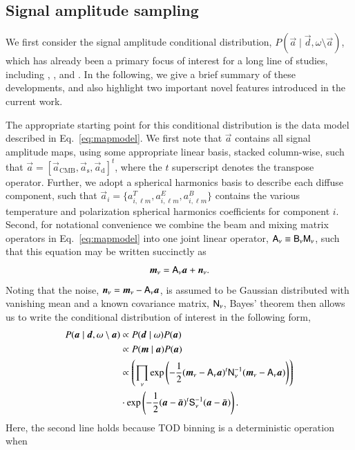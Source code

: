 \documentclass[twocolumn]{aa}
\renewcommand{\d}[0]{\vec{d}}
\newcommand{\A}[0]{\tens{A}}
\newcommand{\n}[0]{\vec{n}}
\renewcommand{\a}[0]{\vec{a}}
\newcommand{\m}[0]{\vec{m}}
\newcommand{\B}[0]{\tens{B}}
\newcommand{\N}[0]{\tens{N}}
\newcommand{\M}[0]{\tens{M}}
\renewcommand{\S}[0]{\tens{S}}
\newcommand{\?}[1]{\textcolor{red}{{\bf [#1]}}}
\begin{document}
\subsection{Signal amplitude sampling}
We first consider the signal amplitude conditional distribution,
$P(\a\mid\d, \omega\setminus\a)$, which has already been a primary
focus of interest for a long line of studies, including
\citet{jewell2004}, \citet{eriksen:2004, eriksen2008}, and
\citet{seljebotn:2019}. In the following, we give a brief summary of
these developments, and also highlight two important novel features
introduced in the current work.

The appropriate starting point for this conditional distribution is the data
model described in Eq.~\eqref{eq:mapmodel}. We first note that $\a$ contains all
signal amplitude maps, using some appropriate linear basis, stacked column-wise,
such that  $\a = [\a_{\mathrm{CMB}}, \a_{\mathrm{s}}, \a_{\mathrm{d}}]^t$, where
the $t$ superscript denotes the transpose operator. Further, we adopt a spherical
harmonics basis to describe each diffuse component, such that $\a_i =
\{a^T_{i,\ell m},a_{i,\ell m}^E,a_{i,\ell m}^B\}$ contains the various
temperature and polarization spherical harmonics coefficients
\citep{zaldarriaga1997} for component $i$. Second, for notational convenience we
combine the beam and mixing matrix operators in Eq.~\eqref{eq:mapmodel} into one
joint linear operator, $\A_{\nu}\equiv\B_{\nu}\M_{\nu}$, such that this equation
may be written succinctly as
\begin{equation}
  \m_{\nu} = \A_{\nu}\a + \n_{\nu}.
  \label{eq:simple_data_model}
\end{equation}
Noting that the noise, $\n_{\nu} = \m_{\nu} - \A_{\nu}\a$, is
assumed to be Gaussian distributed with vanishing mean and a known covariance 
matrix, $\N_{\nu}$, Bayes' theorem then allows us to write the conditional
distribution of interest in the following form,
\begin{align}
  P(\a\mid\d, \omega\setminus\a) &\propto P(\d\mid\omega)P(\a)\\
  &\propto P(\m\mid\a)P(\a)\\
  & \propto
  \left(\prod_{\nu}\mathrm \exp\left(-\frac{1}{2}(\m_{\nu}-\A_{\nu}\a)^t\N_{\nu}^{-1}(\m_{\nu}-\A_{\nu}\a)\right)\right)\nonumber\\
  &\cdot \mathrm \exp \left(-\frac{1}{2}(\a-\bar{\a})^t\S_{\nu}^{-1}(\a-\bar{\a})\right).
  \label{eq:posterior}
\end{align}
Here, the second line holds because TOD binning is a deterministic operation when
\end{document}
